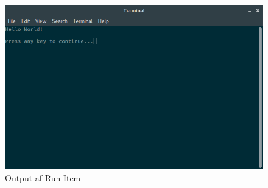 \documentclass[a4paper,10pt]{article}
\begin{document}
\begin{figure}[H]
\includegraphics[width=\textwidth]{Screenshots/hello.png}
    \centering
    \caption{Output af Run Item}
    \label{fig:my_label}
\end{figure}
\end{document}
